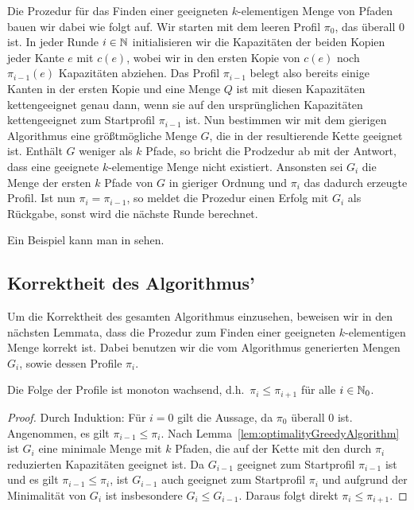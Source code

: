 Die Prozedur für das Finden einer geeigneten $k$-elementigen Menge von Pfaden bauen wir dabei wie folgt auf.
Wir starten mit dem leeren Profil $\pi_0$, das überall 0 ist.
In jeder Runde $i \in \mathbb N$ initialisieren wir die Kapazitäten der beiden Kopien jeder Kante $e$ mit $c(e)$, wobei wir
in den ersten Kopie von $c(e)$ noch $\pi_{i-1}(e)$ Kapazitäten abziehen.
Das Profil $\pi_{i-1}$ belegt also bereits einige Kanten in der ersten Kopie und eine Menge $Q$ ist mit diesen Kapazitäten
kettengeeignet genau dann, wenn sie auf den ursprünglichen Kapazitäten kettengeeignet zum Startprofil $\pi_{i-1}$ ist.
Nun bestimmen wir mit dem gierigen Algorithmus eine größtmögliche Menge $G$, die in der resultierende Kette
geeignet ist.
Enthält $G$ weniger als $k$ Pfade, so bricht die Prodzedur ab mit der Antwort, dass eine geeignete $k$-elementige Menge
nicht existiert.
Ansonsten sei $G_i$ die Menge der ersten $k$ Pfade von $G$ in gieriger Ordnung und $\pi_{i}$ das dadurch erzeugte
Profil.
Ist nun $\pi_i = \pi_{i-1}$, so meldet die Prozedur einen Erfolg mit $G_i$ als Rückgabe, sonst wird die nächste Runde
berechnet.

Ein Beispiel kann man in  sehen.

\subsection{Korrektheit des Algorithmus'}\label{subsec:korrektheitCallControlInRings}
Um die Korrektheit des gesamten Algorithmus einzusehen, beweisen wir in den nächsten Lemmata, dass die Prozedur zum
Finden einer geeigneten $k$-elementigen Menge korrekt ist.
Dabei benutzen wir die vom Algorithmus generierten Mengen $G_i$, sowie dessen Profile $\pi_i$.

\begin{lemma}\label{lem:monotonousProfiles}
    Die Folge der Profile ist monoton wachsend, d.h.\ $\pi_i \leq \pi_{i+1}$ für alle $i \in \mathbb N_0$.
\end{lemma}
\begin{proof}
    Durch Induktion: Für $i=0$ gilt die Aussage, da $\pi_0$ überall 0 ist.
    Angenommen, es gilt $\pi_{i-1} \leq \pi_i$.
    Nach Lemma~\ref{lem:optimalityGreedyAlgorithm} ist $G_{i}$ eine minimale Menge mit $k$ Pfaden, die auf der Kette mit den durch $\pi_{i}$
    reduzierten Kapazitäten geeignet ist.
    Da $G_{i-1}$ geeignet zum Startprofil $\pi_{i-1}$ ist und es gilt $\pi_{i-1} \leq \pi_i$, ist $G_{i-1}$ auch
    geeignet zum Startprofil $\pi_{i}$ und aufgrund der Minimalität von $G_i$ ist insbesondere $G_i \leq G_{i-1}$.
    Daraus folgt direkt $\pi_i \leq \pi_{i+1}$.
\end{proof}


